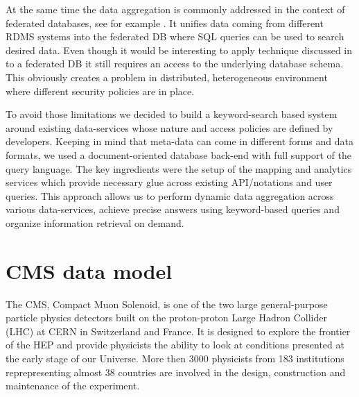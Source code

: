 \documentclass[1p,times]{elsarticle}
\begin{document}
At the same time the data aggregation is commonly addressed in the context of
federated databases, see for example \cite{FedDB}. It unifies data coming 
from different RDMS systems into the federated DB where SQL queries can be used to 
search desired data. Even though it would be interesting to apply technique 
discussed in \cite{DBS-QL} to a federated DB it still requires 
an access to the underlying database schema. This obviously creates a problem
in distributed, heterogeneous environment where different security policies
are in place.

To avoid those limitations we decided to build a keyword-search based system around
existing data-services whose nature and access policies are defined by developers.
Keeping in mind that meta-data can come in different forms and data formats,
we used a document-oriented database back-end with full support of the query language.
The key ingredients were the setup of the mapping and analytics services which provide
necessary glue across existing API/notations and user queries. This approach 
allows us to perform dynamic data aggregation across various data-services, achieve
precise answers using keyword-based queries
and organize information retrieval on demand.

\section{CMS data model\label{DataModel}}
The CMS, Compact Muon Solenoid, \cite{CMS} 
is one of the two large general-purpose particle physics detectors built on 
the proton-proton Large Hadron Collider (LHC) at CERN in Switzerland and France. 
It is designed to explore the frontier of the HEP and provide physicists
the ability to look at conditions presented at the early stage of our Universe.
More then 3000 physicists from 183 institutions reprepresenting almost 
38 countries are involved in the design, construction and maintenance of the experiment.
\end{document}
